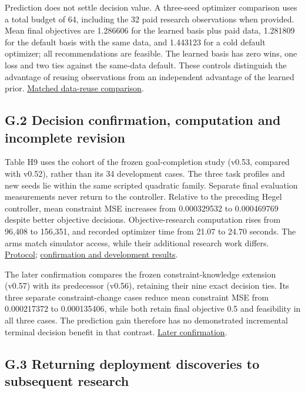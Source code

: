 \documentclass[11pt,a4paper]{article}
\begin{document}
Prediction does not settle decision value. A three-seed optimizer comparison
uses a total budget of 64, including the 32 paid research observations when
provided. Mean final objectives are 1.286606 for the learned basis plus paid
data, 1.281809 for the default basis with the same data, and 1.443123 for a
cold default optimizer; all recommendations are feasible. The learned basis
has zero wins, one loss and two ties against the same-data default. These
controls distinguish the advantage of reusing observations from an independent
advantage of the learned prior.
\hyperlink{artifact-125}{Matched data-reuse comparison}.


\subsection*{G.2 Decision confirmation, computation and incomplete revision}

Table H9 uses the  cohort of the frozen goal-completion
study (v0.53, compared with v0.52), rather than its 34 development cases. The three task profiles and new
seeds lie within the same scripted quadratic family. Separate final evaluation
measurements never return to the controller. Relative to the preceding Hegel
controller, mean constraint MSE increases from 0.000329532 to 0.000469769 despite
better objective decisions. Objective-research computation rises from 96,408 to
156,351, and recorded optimizer time from 21.07 to 24.70 seconds. The arms match
simulator access, while their additional research work differs.
\hyperlink{artifact-126}{Protocol};
\hyperlink{artifact-127}{confirmation and development results}.


The later confirmation compares the frozen constraint-knowledge extension
(v0.57) with its predecessor (v0.56), retaining their nine exact decision ties.
Its three separate constraint-change cases reduce mean constraint MSE from
0.000217372 to 0.000135406, while both retain final objective 0.5 and feasibility
in all three cases. The prediction gain therefore has no demonstrated incremental
terminal decision benefit in that contrast.
\hyperlink{artifact-128}{Later confirmation}.


\subsection*{G.3 Returning deployment discoveries to subsequent research}
\end{document}
